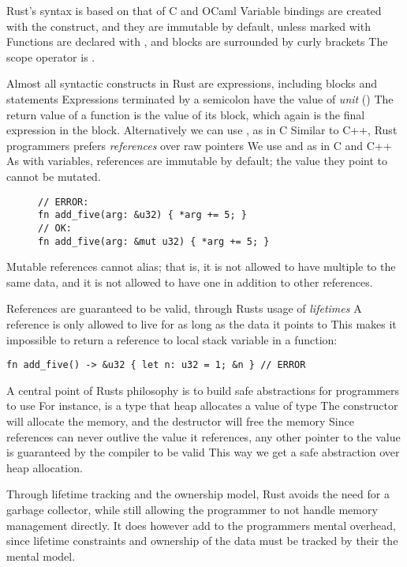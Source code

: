 \documentclass[b5paper]{report}
\begin{document}
Rust's syntax is based on that of C and OCaml Variable bindings are created
with the  construct, and they are immutable by default, unless marked
with  Functions are declared with , and blocks are
surrounded by curly brackets The scope operator is \code{::}.

Almost all syntactic constructs in Rust are expressions, including blocks and
 statements Expressions terminated by a semicolon have the value of
\emph{unit} (\code{()}) The return value of a function is the value of its
block, which again is the final expression in the block. Alternatively we can
use , as in C Similar to C++, Rust programmers prefers
\emph{references} over raw pointers We use \code{\&} and \code{*} as in C and
C++ As with variables, references are immutable by default; the value they
point to cannot be mutated.

\begin{figure}
\begin{lstlisting}[firstnumber=last]
// ERROR:
fn add_five(arg: &u32) { *arg += 5; }
// OK:
fn add_five(arg: &mut u32) { *arg += 5; }
\end{lstlisting}
\end{figure}

Mutable references cannot alias; that is, it is not allowed to have multiple
 to the same data, and it is not allowed to have one 
in addition to other references.

References are guaranteed to be valid, through Rusts usage of
\emph{lifetimes} A reference is only allowed to live for as long as the data
it points to This makes it impossible to return a reference to local stack
variable in a function:
\begin{lstlisting}[firstnumber=last]
fn add_five() -> &u32 { let n: u32 = 1; &n } // ERROR
\end{lstlisting}

A central point of Rusts philosophy is to build safe abstractions for
programmers to use For instance,  is a type that heap
allocates a value of type  The constructor will allocate the memory,
and the destructor will free the memory Since references can never outlive
the value it references, any other pointer to the value is guaranteed by the
compiler to be valid This way we get a safe abstraction over heap allocation.

Through lifetime tracking and the ownership model, Rust avoids the need for a
garbage collector, while still allowing the programmer to not handle memory
management directly. It does however add to the programmers mental overhead,
since lifetime constraints and ownership of the data must be tracked by their
the mental model.
\end{document}
